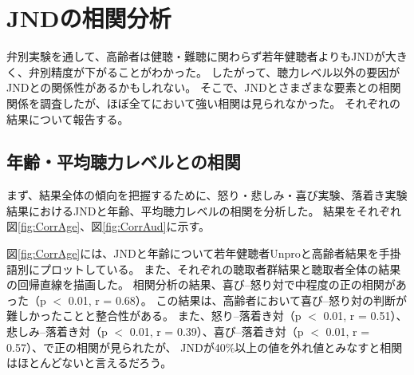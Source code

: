 \chapter{JNDの相関分析}
\label{sec:CorrJND}
弁別実験を通して、高齢者は健聴・難聴に関わらず若年健聴者よりもJNDが大きく、弁別精度が下がることがわかった。
したがって、聴力レベル以外の要因がJNDとの関係性があるかもしれない。
そこで、JNDとさまざまな要素との相関関係を調査したが、ほぼ全てにおいて強い相関は見られなかった。
それぞれの結果について報告する。



\section{年齢・平均聴力レベルとの相関}
まず、結果全体の傾向を把握するために、怒り・悲しみ・喜び実験、落着き実験結果におけるJNDと年齢、平均聴力レベルの相関を分析した。
結果をそれぞれ図\ref{fig:CorrAge}、図\ref{fig:CorrAud}に示す。 

図\ref{fig:CorrAge}には、JNDと年齢について若年健聴者Unproと高齢者結果を手掛語別にプロットしている。
また、それぞれの聴取者群結果と聴取者全体の結果の回帰直線を描画した。
相関分析の結果、喜び--怒り対で中程度の正の相関があった（p $<$ 0.01, r = 0.68）。
この結果は、高齢者において喜び--怒り対の判断が難しかったことと整合性がある。
また、怒り--落着き対（p $<$ 0.01, r = 0.51）、悲しみ--落着き対（p $<$ 0.01, r = 0.39）、喜び--落着き対（p $<$ 0.01, r = 0.57）、で正の相関が見られたが、
JNDが40\%以上の値を外れ値とみなすと相関はほとんどないと言えるだろう。



